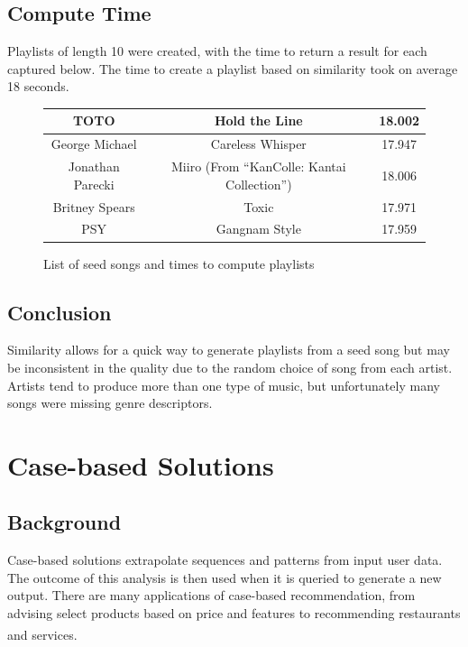 \documentclass[a4paper, 12pt]{report}
\begin{document}
\section{Compute Time}
Playlists of length 10 were created, with the time to return a result for each captured below. The time to create a playlist based on similarity took on average 18 seconds.
\begin{figure}[H]
    \begin{center}
        \begin{tabulary}{\linewidth}{|C|C|C|} 
            \hline
            TOTO & Hold the Line & 18.002 \\
            \hline
            George Michael & Careless Whisper & 17.947 \\
            \hline
            Jonathan Parecki & Miiro (From ``KanColle: Kantai Collection'') &  18.006 \\
            \hline
            Britney Spears & Toxic & 17.971 \\
            \hline
            PSY & Gangnam Style & 17.959 \\
            \hline
        \end{tabulary}
    \caption{List of seed songs and times to compute playlists}
    \end{center}
\end{figure}

\section{Conclusion}
Similarity allows for a quick way to generate playlists from a seed song but may be inconsistent in the quality due to the random choice of song from each artist.
Artists tend to produce more than one type of music, but unfortunately many songs were missing genre descriptors.

\chapter{Case-based Solutions}\label{chap:casesolutions}
\section{Background}
Case-based solutions extrapolate sequences and patterns from input user data.
The outcome of this analysis is then used when it is queried to generate a new output.
There are many applications of case-based recommendation, from advising select products based on price and features to recommending restaurants and services\textsuperscript{\cite{cbr-general}}.
\end{document}
